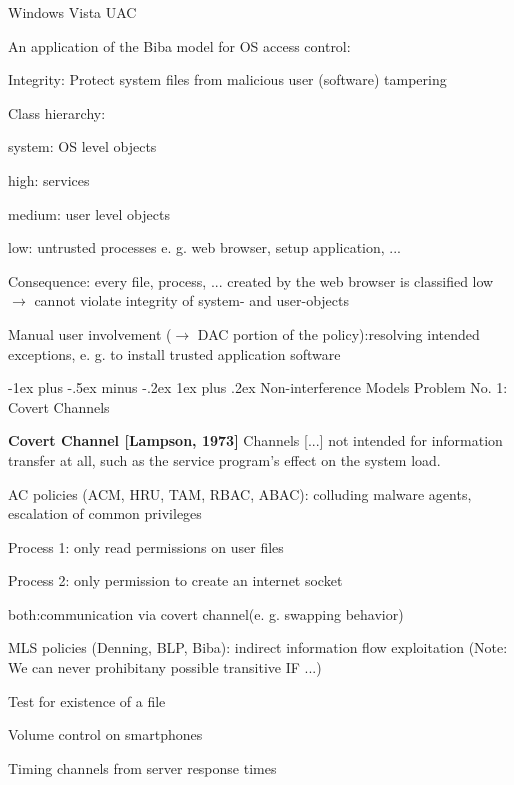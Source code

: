 \documentclass[a4paper]{article}
\makeatletter
\renewcommand{\note}[2]{\begin{noteBox} \textbf{#1} #2 \end{noteBox}}
\renewcommand{\subsubsection}{\@startsection{subsubsection}{3}{0mm}%
                                {-1ex plus -.5ex minus -.2ex}%
                                {1ex plus .2ex}%
                                {\normalfont\small\bfseries}}
\makeatother
\begin{document}
\begin{multicols}{3}
    Windows Vista UAC
    \begin{itemize*}
        \item An application of the Biba model for OS access control:
        \item Integrity: Protect system files from malicious user (software) tampering
        \item Class hierarchy:
        \begin{itemize*}
            \item system: OS level objects
            \item high: services
            \item medium: user level objects
            \item low: untrusted processes e. g. web browser, setup application, ...
        \end{itemize*}
        \item Consequence: every file, process, ... created by the web browser is classified low $\rightarrow$ cannot violate integrity of system- and user-objects
        \item Manual user involvement ($\rightarrow$ DAC portion of the policy):resolving intended exceptions, e. g. to install trusted application software
    \end{itemize*}


    \subsubsection{Non-interference Models}
    Problem No. 1: Covert Channels

    \note{Covert Channel [Lampson, 1973]}{Channels [...] not intended for information transfer at all, such as the service program’s effect on the system load.}

    \begin{itemize*}
        \item AC policies (ACM, HRU, TAM, RBAC, ABAC): colluding malware agents, escalation of common privileges
        \begin{itemize*}
            \item Process 1: only read permissions on user files
            \item Process 2: only permission to create an internet socket
            \item both:communication via covert channel(e. g. swapping behavior)
        \end{itemize*}
        \item MLS policies (Denning, BLP, Biba): indirect information flow exploitation (Note: We can never prohibitany possible transitive IF ...)
        \begin{itemize*}
            \item Test for existence of a file
            \item Volume control on smartphones
            \item Timing channels from server response times
        \end{itemize*}
    \end{itemize*}


\end{multicols}
\end{document}
